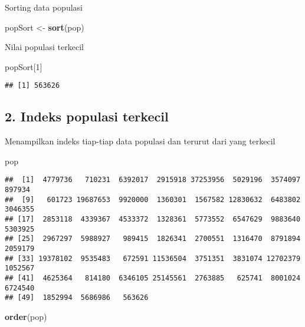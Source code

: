 \documentclass[
]{article}
\newenvironment{Shaded}{\begin{snugshade}}{\end{snugshade}}
\newcommand{\DecValTok}[1]{\textcolor[rgb]{0.00,0.00,0.81}{#1}}
\newcommand{\KeywordTok}[1]{\textcolor[rgb]{0.13,0.29,0.53}{\textbf{#1}}}
\newcommand{\NormalTok}[1]{#1}
\newcommand{\StringTok}[1]{\textcolor[rgb]{0.31,0.60,0.02}{#1}}
\begin{document}
Sorting data populasi

\begin{Shaded}
\begin{Highlighting}[]
\NormalTok{popSort <-}\StringTok{ }\KeywordTok{sort}\NormalTok{(pop)}
\end{Highlighting}
\end{Shaded}

Nilai populasi terkecil

\begin{Shaded}
\begin{Highlighting}[]
\NormalTok{popSort[}\DecValTok{1}\NormalTok{]}
\end{Highlighting}
\end{Shaded}

\begin{verbatim}
## [1] 563626
\end{verbatim}

\hypertarget{indeks-populasi-terkecil}{%
\subsection{2. Indeks populasi
terkecil}\label{indeks-populasi-terkecil}}

Menampilkan indeks tiap-tiap data populasi dan terurut dari yang
terkecil

\begin{Shaded}
\begin{Highlighting}[]
\NormalTok{pop}
\end{Highlighting}
\end{Shaded}

\begin{verbatim}
##  [1]  4779736   710231  6392017  2915918 37253956  5029196  3574097   897934
##  [9]   601723 19687653  9920000  1360301  1567582 12830632  6483802  3046355
## [17]  2853118  4339367  4533372  1328361  5773552  6547629  9883640  5303925
## [25]  2967297  5988927   989415  1826341  2700551  1316470  8791894  2059179
## [33] 19378102  9535483   672591 11536504  3751351  3831074 12702379  1052567
## [41]  4625364   814180  6346105 25145561  2763885   625741  8001024  6724540
## [49]  1852994  5686986   563626
\end{verbatim}

\begin{Shaded}
\begin{Highlighting}[]
\KeywordTok{order}\NormalTok{(pop)}
\end{Highlighting}
\end{Shaded}
\end{document}
